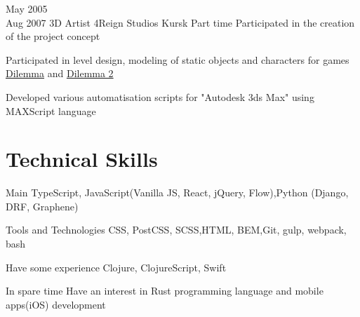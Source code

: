 \documentclass[11pt,a4paper,sans]{moderncv}
\newcommand{\lang}[2]{#2}
\begin{document}
\cventry
    {\lang{Май}{May} 2005\\\lang{Авг}{Aug} 2007}
    {\lang
        {3D художник}
        {3D Artist}}
    {4Reign Studios}
    {\lang
        {Курск}
        {Kursk}}
    {\lang
        {Частичная занятость}
        {Part time}}
    {\lang
        {Принимал участие в создании концепции проекта}
        {Participated in the creation of the project concept}}

\cvlistitem
    {\lang
        {Занимался дизайном уровней, моделированием статичных объектов и персонажей для игр «\href{https://www.igromania.ru/game/3494/Dilemma.html}{Dilemma}» и «\href{https://www.igromania.ru/game/3959/Dilemma_2.html}{Dilemma 2}»}
        {Participated in level design, modeling of static objects and characters for games {\textquotedbl}\href{https://www.igromania.ru/game/3494/Dilemma.html}{Dilemma}{\textquotedbl} and {\textquotedbl}\href{https://www.igromania.ru/game/3959/Dilemma_2.html}{Dilemma 2}{\textquotedbl}}}

\cvlistitem
    {\lang
        {Разрабатывал пользовательские утилиты для пакета 3D-моделирования Autodesk 3ds MAX на языке MAXScript.}
        {Developed various automatisation scripts for "Autodesk 3ds Max" using MAXScript language}\\}


\section
    {\lang
        {Технические навыки}
        {Technical Skills}}

\cvline
    {\lang
        {Главное}
        {Main}}
    {TypeScript, JavaScript(Vanilla JS, React, jQuery, Flow),\newline Python (Django, DRF, Graphene)\newline}

\cvline
    {\lang
        {Использую инструменты и технологии}
        {Tools and Technologies}}
    {CSS, PostCSS, SCSS,\newline HTML, BEM,\newline Git, gulp, webpack, bash\newline}

\cvline
    {\lang
        {Имею небольшой опыт}
        {Have some experience}}
    {Clojure, ClojureScript, Swift\newline}

\cvline
    {\lang
        {В свободное время}
        {In spare time}}
    {\lang
        {интересуюсь Rust}
        {Have an interest in Rust programming language and mobile apps(iOS) development\newline}}
\end{document}
